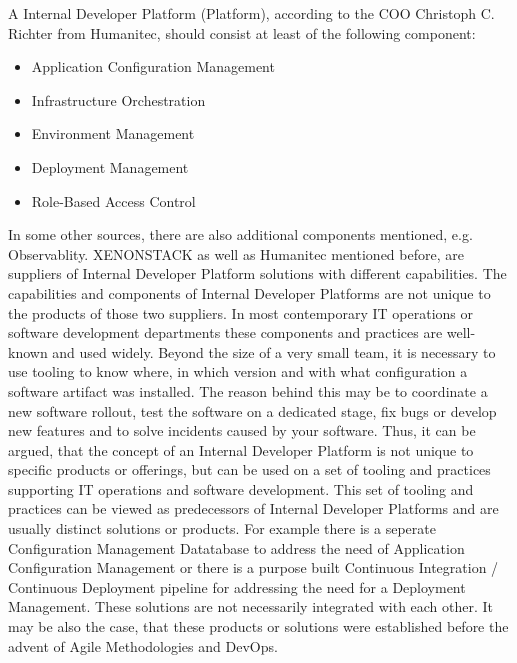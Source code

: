 \documentclass[a4paper,12pt]{article}
\begin{document}
    A Internal Developer Platform (Platform), according to the COO Christoph C. Richter from Humanitec\cite{richteretal},
    should consist at least of the following component:
    \begin{itemize}
        \item Application Configuration Management
        \item Infrastructure Orchestration
        \item Environment Management
        \item Deployment Management
        \item Role-Based Access Control
    \end{itemize}
    In some other sources, there are also additional components mentioned, e.g. Observablity\cite{xenon}. XENONSTACK as
    well as Humanitec mentioned before, are suppliers of Internal Developer Platform solutions with different capabilities.
    The capabilities and components of Internal Developer Platforms are not unique to the products of those two suppliers.
    In most contemporary IT operations or software development departments these components and practices are well-known
    and used widely.
    Beyond the size of a very small team, it is necessary to use tooling to know where, in which version and with what
    configuration a software artifact was installed.
    The reason behind this may be to coordinate a new software rollout, test the software on a dedicated stage, fix bugs
    or develop new features and to solve incidents caused by your software.
    Thus, it can be argued, that the concept of an Internal Developer Platform is not unique to specific products
    or offerings, but can be used on a set of tooling and practices supporting IT operations and software development.
    This set of tooling and practices can be viewed as predecessors of Internal Developer Platforms and are usually
    distinct solutions or products.
    For example there is a seperate Configuration Management Datatabase
    to address the need of Application Configuration Management or there is a purpose built Continuous Integration /
    Continuous Deployment pipeline for addressing the need for a Deployment Management.
    These solutions are not necessarily integrated with each other.
    It may be also the case, that these
    products or solutions were established before the advent of Agile Methodologies and DevOps.
\end{document}

